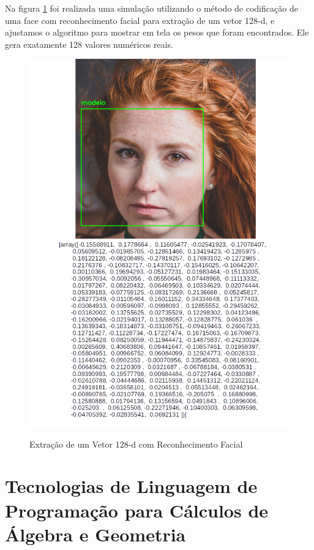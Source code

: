 Na figura \ref{fig:ext128d} foi realizada uma simulação utilizando o método de codificação de uma face com reconhecimento facial para extração de um vetor 128-d, e ajustamos o algoritmo para mostrar em tela os pesos que foram encontrados. Ele gera exatamente 128 valores numéricos reais. 

\begin{figure}[htpb]
  \centering
  \caption{Extração de um Vetor 128-d com Reconhecimento Facial}
  \includegraphics[scale=.5]{figs/modelo.png}
  \label{fig:ext128d}
\end{figure}

\section{Tecnologias de Linguagem de Programação para Cálculos de Álgebra e Geometria}

